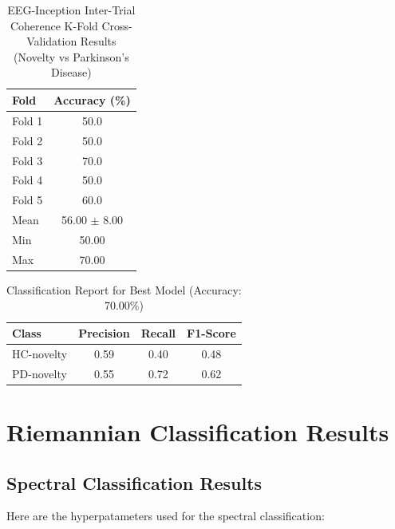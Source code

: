 \documentclass[12pt]{report}
\begin{document}
\begin{table}[h]
\centering
\caption{EEG-Inception Inter-Trial Coherence K-Fold Cross-Validation Results (Novelty vs Parkinson's Disease)}
\begin{tabular}{lc}
\hline
\textbf{Fold} & \textbf{Accuracy (\%)} \\
\hline
Fold 1 & 50.0 \\
Fold 2 & 50.0 \\
Fold 3 & 70.0 \\
Fold 4 & 50.0 \\
Fold 5 & 60.0 \\
\hline
Mean & 56.00 $\pm$ 8.00 \\
Min & 50.00 \\
Max & 70.00 \\
\hline
\end{tabular}
\end{table}

\begin{table}[h]
\centering
\caption{Classification Report for Best Model (Accuracy: 70.00\%)}
\begin{tabular}{lccc}
\hline
\textbf{Class} & \textbf{Precision} & \textbf{Recall} & \textbf{F1-Score} \\
\hline
HC-novelty & 0.59 & 0.40 & 0.48 \\
PD-novelty & 0.55 & 0.72 & 0.62 \\
\hline
\end{tabular}
\end{table}

\section{Riemannian Classification Results}
\subsection{Spectral Classification Results}
Here are the hyperpatameters used for the spectral classification:
\end{document}
